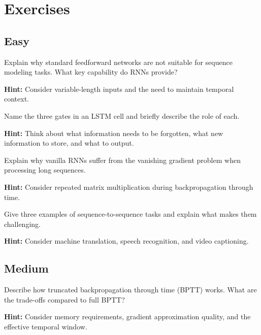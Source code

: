 
\section*{Exercises}

\subsection*{Easy}

\begin{problem}
Explain why standard feedforward networks are not suitable for sequence modeling tasks. What key capability do RNNs provide?

\textbf{Hint:} Consider variable-length inputs and the need to maintain temporal context.
\end{problem}

\begin{problem}
Name the three gates in an LSTM cell and briefly describe the role of each.

\textbf{Hint:} Think about what information needs to be forgotten, what new information to store, and what to output.
\end{problem}

\begin{problem}
Explain why vanilla RNNs suffer from the vanishing gradient problem when processing long sequences.

\textbf{Hint:} Consider repeated matrix multiplication during backpropagation through time.
\end{problem}

\begin{problem}
Give three examples of sequence-to-sequence tasks and explain what makes them challenging.

\textbf{Hint:} Consider machine translation, speech recognition, and video captioning.
\end{problem}

\subsection*{Medium}

\begin{problem}
Describe how truncated backpropagation through time (BPTT) works. What are the trade-offs compared to full BPTT?

\textbf{Hint:} Consider memory requirements, gradient approximation quality, and the effective temporal window.
\end{problem}

